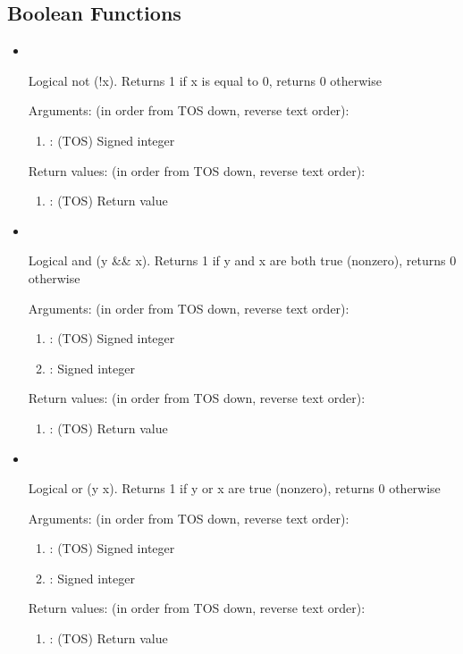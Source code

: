 \subsection{Boolean Functions}
\begin{itemize}

\item {}\ 

\noindent Logical not (!x). Returns 1 if x is equal to 0, returns 0 otherwise

\noindent Arguments: (in order from TOS down, reverse text order):
\begin{enumerate}
\item {}: (TOS) Signed integer
\end{enumerate}

\noindent Return values: (in order from TOS down, reverse text order):
\begin{enumerate}
\item {}: (TOS) Return value
\end{enumerate}

\item {}\ 

\noindent Logical and (y {\&}{\&} x). Returns 1 if y and x are both true (nonzero), returns 0 otherwise

\noindent Arguments: (in order from TOS down, reverse text order):
\begin{enumerate}
\item {}: (TOS) Signed integer
\item {}: Signed integer
\end{enumerate}

\noindent Return values: (in order from TOS down, reverse text order):
\begin{enumerate}
\item {}: (TOS) Return value
\end{enumerate}

\item {}\ 

\noindent Logical or (y {\textbar}{\textbar} x). Returns 1 if y or x are true (nonzero), returns 0 otherwise

\noindent Arguments: (in order from TOS down, reverse text order):
\begin{enumerate}
\item {}: (TOS) Signed integer
\item {}: Signed integer
\end{enumerate}

\noindent Return values: (in order from TOS down, reverse text order):
\begin{enumerate}
\item {}: (TOS) Return value
\end{enumerate}

\end{itemize}
